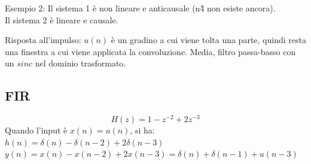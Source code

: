 Esempio 2:
Il sistema 1 è non lineare e anticausale (n\^4 non esiste ancora). \\
Il sistema 2 è lineare e causale.


Risposta all'impulso: $u(n)$ è un gradino a cui viene tolta una parte, quindi resta una finestra a cui viene applicata la convoluzione. Media, filtro passa-basso con un $sinc$ nel dominio trasformato.


\subsection{FIR}
$$H(z) = 1 - z^{-2} + 2z^{-3}$$
Quando l'input è $x(n) = u(n)$, si ha:
$h(n) = \delta(n) - \delta(n-2) + 2\delta(n-3)$ \\
$y(n) = x(n) - x(n-2) + 2x(n-3) = \delta(n) + \delta(n-1) + u(n-3)$



